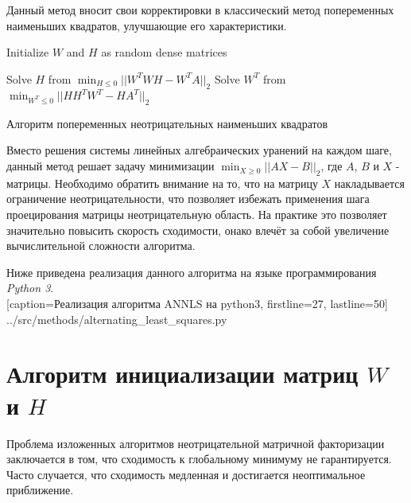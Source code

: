 Данный метод вносит свои корректировки в классический метод попеременных наименьших квадратов,
улучшающие его характеристики.


\begin{algorithm} \label{alg:als_nnls}

  \BlankLine
  \BlankLine


  \BlankLine

  Initialize $W$ and $H$ as random dense matrices\;

   {
    Solve $H$ from $\displaystyle\min_{H \leq 0}||W^TWH - W^TA||_2$\;
    Solve $W^T$ from $\displaystyle\min_{W^T \leq 0}||HH^TW^T - HA^T||_2$\;
  }

  \BlankLine

  \caption{Алгоритм попеременных неотрицательных наименьших квадратов}
\end{algorithm}

Вместо решения системы линейных алгебраических уранений на каждом шаге,
данный метод решает задачу минимизации $\displaystyle\min_{X \geq 0}||AX - B||_2$, где $A$, $B$ и $X$ - матрицы.
Необходимо обратить внимание на то, что на матрицу $X$ накладывается ограничение неотрицательности,
что позволяет избежать применения шага проецирования матрицы неотрицательную область.
На практике это позволяет значительно повысить скорость сходимости,
онако влечёт за собой увеличение вычислительной сложности алгоритма.

\newpage

Ниже приведена реализация данного алгоритма на языке программирования \textit{Python 3}.
\\


  [caption=Реализация алгоритма ANNLS на python3, firstline=27, lastline=50]
  {../src/methods/alternating_least_squares.py} \label{code:als_nnls}





\newpage





\section{Алгоритм инициализации матриц $W$ и $H$}

Проблема изложенных алгоритмов неотрицательной матричной факторизации заключается в том,
что сходимость к глобальному минимуму не гарантируется.
Часто случается, что сходимость медленная и достигается неоптимальное приближение.

